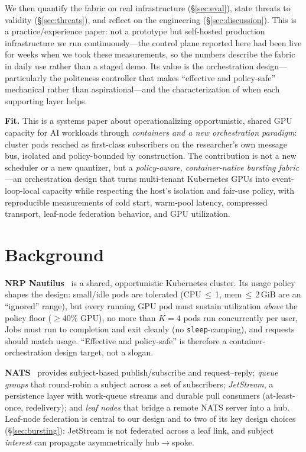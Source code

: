 \documentclass[conference]{IEEEtran}
\newcommand{\rev}[1]{#1}%
\begin{document}
We then quantify the fabric on real infrastructure (\S\ref{sec:eval}), state threats to validity
(\S\ref{sec:threats}), and reflect on the engineering (\S\ref{sec:discussion}). This is a
practice/experience paper: not a prototype but self-hosted production infrastructure we run
continuously---the control plane reported here had been live for weeks when we took these
measurements, so the numbers describe the fabric in daily use rather than a staged demo. Its value
is the orchestration design---particularly the politeness controller that makes ``effective and
policy-safe'' mechanical rather than aspirational---and the characterization of when each
supporting layer helps.

\rev{\textbf{Fit.} This is a systems paper about operationalizing opportunistic, shared GPU
capacity for AI workloads through \emph{containers and a new orchestration paradigm}: cluster
pods reached as first-class subscribers on the researcher's own message bus, isolated and
policy-bounded by construction. The contribution is not a new scheduler or a new quantizer, but a
\emph{policy-aware, container-native bursting fabric}---an orchestration design that turns
multi-tenant Kubernetes GPUs into event-loop-local capacity while respecting the host's isolation
and fair-use policy, with reproducible measurements of cold start, warm-pool latency, compressed
transport, leaf-node federation behavior, and GPU utilization.}

\section{Background}
\textbf{NRP Nautilus}~\cite{nautilus} is a shared, opportunistic Kubernetes cluster. Its usage
policy shapes the design: small/idle pods are tolerated (CPU\,$\le$\,1, mem\,$\le$\,2\,GiB are an
``ignored'' range), but every running GPU pod must sustain utilization \emph{above} the policy
floor (${\ge}$40\% GPU), no more than $K{=}4$ pods run concurrently per user, Jobs must run to
completion and exit cleanly (no \texttt{sleep}-camping), and requests should match usage. ``Effective and policy-safe'' is therefore a container-orchestration design
target, not a slogan.

\textbf{NATS}~\cite{nats} provides subject-based publish/subscribe and request--reply; \emph{queue
groups} that round-robin a subject across a set of subscribers; \emph{JetStream}, a persistence
layer with work-queue streams and durable pull consumers (at-least-once, redelivery); and
\emph{leaf nodes} that bridge a remote NATS server into a hub. Leaf-node federation is central to
our design and to two of its key design choices (\S\ref{sec:bursting}): JetStream is
not federated across a leaf link, and subject \emph{interest} can propagate asymmetrically
hub$\to$spoke.
\end{document}
